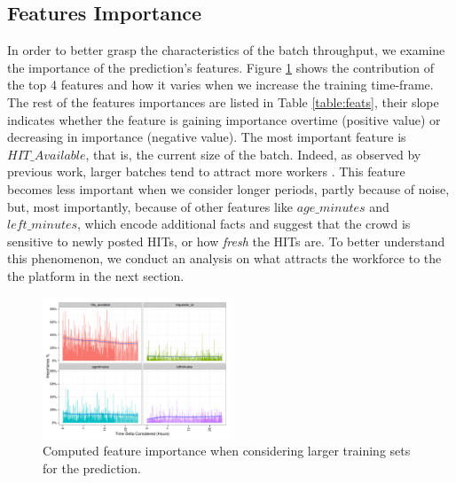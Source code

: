 \subsection{Features Importance}
In order to better grasp the characteristics of the batch throughput, we examine the importance of the prediction's features.
Figure \ref{fig:importances} shows the  contribution of the top 4 features and how it varies  when we increase the training time-frame. The rest of the features importances are listed in Table \ref{table:feats}, their slope indicates whether the feature is gaining importance overtime (positive value) or decreasing in importance (negative value).
The most important feature is $HIT\_Available$, that is, the current size of the batch. Indeed, as observed by previous work, larger batches tend to attract more workers \cite{mturk,crowddb}. This feature becomes less important when we consider longer periods, partly because of noise, but, most importantly, because of other features like $age\_minutes$ and $left\_minutes$, which encode additional facts and suggest that the crowd is sensitive to newly posted HITs, or how \emph{fresh} the HITs are. To better understand this phenomenon, we conduct an analysis on what attracts the workforce to the the platform in the next section.

\begin{figure}[t!]
	\centering
		\includegraphics[width=0.5\textwidth]{figures/importances}
	\caption{Computed feature importance when considering larger training sets for the prediction.}
	\label{fig:importances}
\end{figure}



